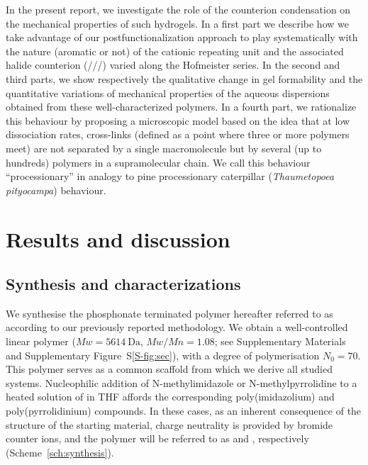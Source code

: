 \documentclass[journal=jacsat,manuscript=article]{achemso}
\begin{document}
In the present report, we investigate the role of the counterion condensation on the mechanical properties of such hydrogels. In a first part we describe how we take advantage of our postfunctionalization approach to play systematically with the nature (aromatic or not) of the cationic repeating unit and the associated halide counterion (///) varied along the Hofmeister series. In the second and third parts, we show respectively the qualitative change in gel formability and the quantitative variations of mechanical properties of the aqueous dispersions obtained from these well-characterized polymers. In a fourth part, we rationalize this behaviour by proposing a microscopic model based on the idea that at low dissociation rates, cross-links (defined as a point where three or more polymers meet) are not separated by a single macromolecule but by several (up to hundreds) polymers in a supramolecular chain. We call this behaviour ``processionary'' in analogy to pine processionary caterpillar (\textit{Thaumetopoea pityocampa}) behaviour\cite{Fabre1916}.%

\section{Results and discussion}

\subsection{Synthesis and characterizations}

We synthesise the phosphonate terminated polymer hereafter referred to as  according to our previously reported methodology\cite{Srour2014,Appukuttan2012}. We obtain a well-controlled linear polymer ($Mw= \SI{5614}{\dalton}$, $Mw/Mn = 1.08$; see Supplementary Materials and Supplementary Figure~S\ref{S-fig:sec}), with a degree of polymerisation $N_0=70$. This polymer serves as a common scaffold from which we derive  all studied systems. Nucleophilic addition of N-methylimidazole or N-methylpyrrolidine to a heated solution of  in THF affords the corresponding poly(imidazolium) and poly(pyrrolidinium) compounds. In these cases, as an inherent consequence of the structure of the starting material, charge neutrality is provided by bromide counter ions, and the polymer will be referred to as  and , respectively (Scheme~\ref{sch:synthesis}).
\end{document}
